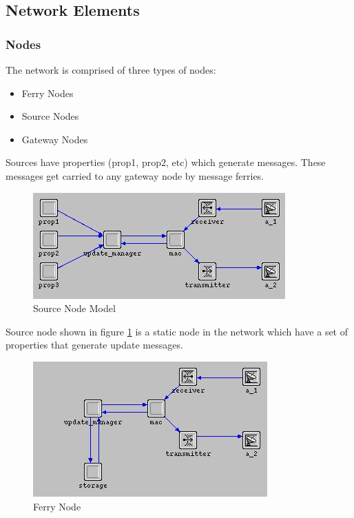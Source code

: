 \subsection{Network Elements}



\subsubsection{Nodes}

The network is comprised of three types of nodes:
\begin{itemize}
\item Ferry Nodes
\item Source Nodes
\item Gateway Nodes
\end{itemize}



Sources have properties (prop1, prop2, etc) which generate messages. These messages get carried to any gateway node by message ferries.

\begin{figure}[h]
    \centering
    \includegraphics[width=.5\textwidth]{images/source}
    \caption{Source Node Model}
    \label{fig:source}
\end{figure}

Source node shown in figure \ref{fig:source} is a static node in the network which have a set of properties that generate update messages. 	


\begin{figure}[h]
    \centering
    \includegraphics[width=.5\textwidth]{images/ferry}
    \caption{Ferry Node}
    \label{fig:Ferry}
\end{figure}

